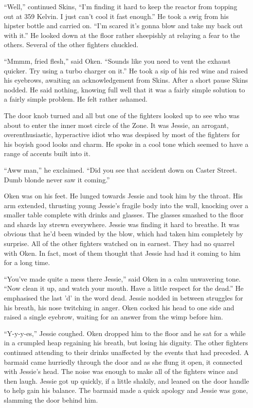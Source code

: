 ``Well,'' continued Skins, ``I'm finding it hard to keep the reactor from topping out at 359 Kelvin.  I just can't cool it fast enough.''  He took a swig from his hipster bottle and carried on.  ``I'm scared it's gonna blow and take my back out with it.''  He looked down at the floor rather sheepishly at relaying a fear to the others.  Several of the other fighters chuckled.

``Mmmm, fried flesh,'' said Oken.  ``Sounds like you need to vent the exhaust quicker.  Try using a turbo charger on it.''  He took a sip of his red wine and raised his eyebrows, awaiting an acknowledgement from Skins.  After a short pause Skins nodded.  He said nothing, knowing full well that it was a fairly simple solution to a fairly simple problem.  He felt rather ashamed.

The door knob turned and all but one of the fighters looked up to see who was about to enter the inner most circle of the Zone.  It was Jessie, an arrogant, overenthusiastic, hyperactive idiot who was despised by most of the fighters for his boyish good looks and charm.  He spoke in a cool tone which seemed to have a range of accents built into it.

``Aww man,'' he exclaimed.  ``Did you see that accident down on Caster Street.  Dumb blonde never saw it coming.''

Oken was on his feet.  He lunged towards Jessie and took him by the throat.  His arm extended, thrusting young Jessie's fragile body into the wall, knocking over a smaller table complete with drinks and glasses.  The glasses smashed to the floor and shards lay strewn everywhere.  Jessie was finding it hard to breathe.  It was obvious that he'd been winded by the blow, which had taken him completely by surprise.  All of the other fighters watched on in earnest.  They had no quarrel with Oken.  In fact, most of them thought that Jessie had had it coming to him for a long time.

``You've made quite a mess there Jessie,'' said Oken in a calm unwavering tone.  ``Now clean it up, and watch your mouth.  Have a little respect for the dead.''  He emphasised the last 'd' in the word dead.  Jessie nodded in between struggles for his breath, his nose twitching in anger.  Oken cocked his head to one side and raised a single eyebrow, waiting for an answer from the wimp before him.

``Y-y-y-es,'' Jessie coughed.  Oken dropped him to the floor and he sat for a while in a crumpled heap regaining his breath, but losing his dignity.  The other fighters continued attending to their drinks unaffected by the events that had preceded.  A barmaid came hurriedly through the door and as she flung it open, it connected with Jessie's head.  The noise was enough to make all of the fighters wince and then laugh.  Jessie got up quickly, if a little shakily, and leaned on the door handle to help gain his balance.  The barmaid made a quick apology and Jessie was gone, slamming the door behind him.

